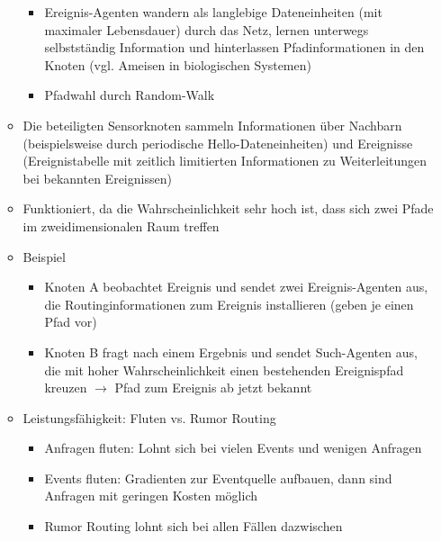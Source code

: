 \begin{itemize}
\begin{itemize}
\begin{itemize}
			\item Ereignis-Agenten wandern als langlebige Dateneinheiten (mit maximaler Lebensdauer) durch das Netz, lernen unterwegs selbstständig Information und hinterlassen Pfadinformationen in den Knoten (vgl. Ameisen in biologischen Systemen)
			\item Pfadwahl durch Random-Walk
		\end{itemize}
		\item Die beteiligten Sensorknoten sammeln Informationen über Nachbarn (beispielsweise durch periodische Hello-Dateneinheiten) und Ereignisse (Ereignistabelle mit zeitlich limitierten Informationen zu Weiterleitungen bei bekannten Ereignissen)
		\item Funktioniert, da die Wahrscheinlichkeit sehr hoch ist, dass sich zwei Pfade im zweidimensionalen Raum treffen
		\item Beispiel
		\begin{itemize}
			\item Knoten A beobachtet Ereignis und sendet zwei Ereignis-Agenten aus, die Routinginformationen zum Ereignis installieren (geben je einen Pfad vor)
			\item Knoten B fragt nach einem Ergebnis und sendet Such-Agenten aus, die mit hoher Wahrscheinlichkeit einen bestehenden Ereignispfad kreuzen \(\rightarrow\) Pfad zum Ereignis ab jetzt bekannt
		\end{itemize}
		\item Leistungsfähigkeit: Fluten vs. Rumor Routing
		\begin{itemize}
			\item Anfragen fluten: Lohnt sich bei vielen Events und wenigen Anfragen
			\item Events fluten: Gradienten zur Eventquelle aufbauen, dann sind Anfragen mit geringen Kosten möglich
			\item Rumor Routing lohnt sich bei allen Fällen dazwischen 
		\end{itemize}
	\end{itemize}
\end{itemize}

